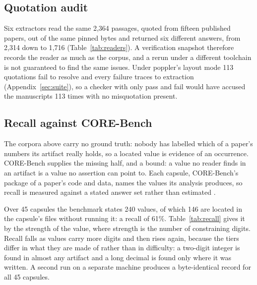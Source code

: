 \documentclass{article}
\begin{document}
\subsection{Quotation audit}
\label{sec:quote}

Six extractors read the same 2{,}364 passages, quoted from fifteen published papers, out of the same pinned bytes and returned six
different answers, from 2{,}314 down to 1{,}716 (Table~\ref{tab:readers}). A verification snapshot therefore records the
reader as much as the corpus, and a rerun under a different toolchain is not guaranteed to find
the same issues. Under poppler's layout mode 113 quotations fail to resolve and every failure
traces to extraction (Appendix~\ref{sec:suite}), so a checker with only pass and fail would have
accused the manuscripts 113 times with no misquotation present.

\subsection{Recall against CORE-Bench}

The corpora above carry no ground truth: nobody has labelled which of a paper's numbers its
artifact really holds, so a located value is evidence of an occurrence. CORE-Bench supplies the missing half, and a bound: a value no reader finds in an artifact is a
value no assertion can point to. Each capsule, CORE-Bench's package of a paper's code and
data, names the values its analysis produces, so recall is measured against a stated answer set
rather than estimated \citep{siegel2024corebench}.

Over 45 capsules the benchmark states 240 values, of which 146 are located in the capsule's files
without running it: a recall of 61\%. Table~\ref{tab:recall} gives it by the strength of the value, where strength is the
number of constraining digits. Recall falls as values carry more digits and then rises again,
because the tiers differ in what they are made of rather than in difficulty: a two-digit
integer is found in almost any artifact and a long decimal is found only where it was written.
A second run on a separate machine produces a byte-identical record for all 45 capsules.
\end{document}
